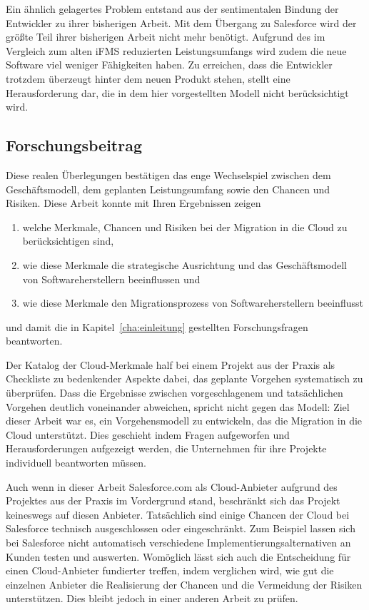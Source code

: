 Ein ähnlich gelagertes Problem entstand aus der sentimentalen Bindung der 
Entwickler zu ihrer bisherigen Arbeit. Mit dem Übergang zu Salesforce wird der 
größte Teil ihrer bisherigen Arbeit nicht mehr benötigt. Aufgrund des im 
Vergleich zum alten iFMS reduzierten Leistungsumfangs wird zudem die neue 
Software viel weniger Fähigkeiten haben. Zu erreichen, dass die 
Entwickler trotzdem überzeugt hinter dem neuen Produkt stehen, stellt eine 
Herausforderung dar, die in dem hier vorgestellten Modell nicht berücksichtigt 
wird.

\subsection{Forschungsbeitrag}
Diese realen Überlegungen bestätigen das enge Wechselspiel zwischen dem 
Geschäftsmodell, dem geplanten Leistungsumfang sowie den Chancen und Risiken.
Diese Arbeit konnte mit Ihren Ergebnissen zeigen
\begin{enumerate}
	\item welche Merkmale, Chancen und Risiken bei der Migration in die 
Cloud zu berücksichtigen sind,
	\item wie diese Merkmale die strategische Ausrichtung und das 
Geschäftsmodell von Softwareherstellern beeinflussen und
	\item wie diese Merkmale den Migrationsprozess von Softwareherstellern 
beeinflusst
\end{enumerate}
und damit die in Kapitel~\ref{cha:einleitung} gestellten Forschungsfragen 
beantworten.

Der Katalog der Cloud-Merkmale half bei einem Projekt aus der Praxis als 
Checkliste zu bedenkender Aspekte dabei, das geplante Vorgehen systematisch zu 
überprüfen. Dass die Ergebnisse zwischen vorgeschlagenem und tatsächlichen 
Vorgehen deutlich voneinander abweichen, spricht nicht gegen das Modell: Ziel 
dieser Arbeit war 
es, ein Vorgehensmodell zu entwickeln, das die Migration in die Cloud 
unterstützt. Dies geschieht indem Fragen aufgeworfen und Herausforderungen 
aufgezeigt werden, die Unternehmen für ihre Projekte individuell beantworten 
müssen. 

Auch wenn in dieser Arbeit Salesforce.com als Cloud-Anbieter aufgrund des 
Projektes aus der Praxis im Vordergrund stand, beschränkt sich das Projekt 
keineswegs auf diesen Anbieter. Tatsächlich sind einige Chancen der Cloud bei 
Salesforce technisch ausgeschlossen oder eingeschränkt. Zum Beispiel lassen 
sich bei Salesforce nicht automatisch verschiedene Implementierungsalternativen 
an Kunden testen und auswerten. 
Womöglich lässt sich auch die Entscheidung für 
einen Cloud-Anbieter fundierter treffen, indem verglichen wird, wie gut die 
einzelnen Anbieter die Realisierung der Chancen und die Vermeidung der Risiken 
unterstützen. Dies bleibt jedoch in einer anderen Arbeit zu prüfen.

